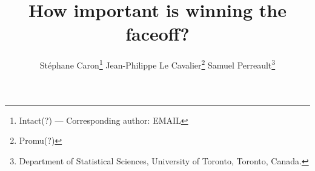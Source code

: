 
\usepackage[margin=1in]{geometry} %


\title{How important is winning the faceoff?}

\author{
Stéphane Caron\footnote{Intact(?) --- Corresponding author: EMAIL} \qquad
Jean-Philippe Le Cavalier\footnote{Promu(?)}  \qquad
Samuel Perreault\footnote{Department of Statistical Sciences, University of Toronto, Toronto, Canada.}
}

